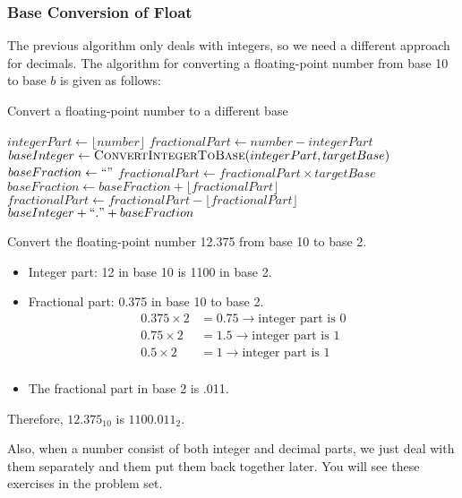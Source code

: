     \subsubsection*{Base Conversion of Float}
    The previous algorithm only deals with integers, so we need a different approach for decimals.
    The algorithm for converting a floating-point number from base 10 to base $b$ is given as follows:

\begin{algorithm}
\caption{Convert a floating-point number to a different base}
\begin{algorithmic}[H]
    \State $integerPart \gets \lfloor number \rfloor$
    \State $fractionalPart \gets number - integerPart$
    \State $baseInteger \gets \Call{ConvertIntegerToBase}{integerPart, targetBase}$
    \State $baseFraction \gets ``"$
        \State $fractionalPart \gets fractionalPart \times targetBase$
        \State $baseFraction \gets baseFraction + \lfloor fractionalPart \rfloor$
        \State $fractionalPart \gets fractionalPart - \lfloor fractionalPart \rfloor$
    \EndWhile
    \State \Return $baseInteger + ``." + baseFraction$
\EndFunction
\end{algorithmic}
\end{algorithm}

\begin{example}
Convert the floating-point number 12.375 from base 10 to base 2.
\begin{itemize}
\item Integer part: 12 in base 10 is 1100 in base 2.
\item Fractional part: 0.375 in base 10 to base 2.
\begin{align*}
0.375 \times 2 &= 0.75 \rightarrow \text{integer part is 0} \\
0.75 \times 2 &= 1.5 \rightarrow \text{integer part is 1} \\
0.5 \times 2 &= 1 \rightarrow \text{integer part is 1} \\
\end{align*}
\item The fractional part in base 2 is .011.
\end{itemize}

Therefore, $12.375_{10}$ is $1100.011_{2}$.
\end{example}
Also, when a number consist of both integer and decimal parts, we just deal with them separately
and them put them back together later. You will see these exercises in the problem set.

